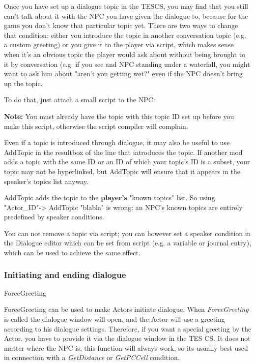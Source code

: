 Once you have set up a dialogue topic in the TESCS, you may find that
you still can't talk about it with the NPC you have given the dialogue
to, because for the game you don't know that particular topic yet. There
are two ways to change that condition: either you introduce the topic in
another conversation topic (e.g. a custom greeting) or you give it to
the player via script, which makes sense when it's an obvious topic the
player would ask about without being brought to it by conversation (e.g.
if you see and NPC standing under a waterfall, you might want to ask him
about "aren't you getting wet?" even if the NPC doesn't bring up the
topic.

To do that, just attach a small script to the NPC:



\textbf{Note:} You must already have the topic with this topic ID set up
before you make this script, otherwise the script compiler will
complain.

Even if a topic is introduced through dialogue, it may also be useful to
use AddTopic in the resultbox of the line that introduces the topic. If
another mod adds a topic with the same ID or an ID of which your topic's
ID is a subset, your topic may not be hyperlinked, but AddTopic will
ensure that it appears in the speaker's topics list anyway.

AddTopic adds the topic to the \textbf{player's} "known topics" list. So
using\\
"Actor\_ID"-> AddTopic "blabla" is wrong: an NPC's known
topics are entirely predefined by speaker conditions.

You can not remove a topic via script; you can however set a speaker
condition in the Dialogue editor which can be set from script (e.g. a
variable or journal entry), which can be used to achieve the same
effect.

\hypertarget{initiating-and-ending-dialogue}{%
\subsubsection{Initiating and ending
dialogue}\label{initiating-and-ending-dialogue}}

ForceGreeting

ForceGreeting can be used to make Actors initiate dialogue. When
\emph{ForceGreeting} is called the dialogue window will open, and the
Actor will use a greeting according to his dialogue settings. Therefore,
if you want a special greeting by the Actor, you have to provide it via
the dialogue window in the TES CS. It does not matter where the NPC is,
this function will always work, so its usually best used in connection
with a \emph{GetDistance} or \emph{GetPCCell} condition.

